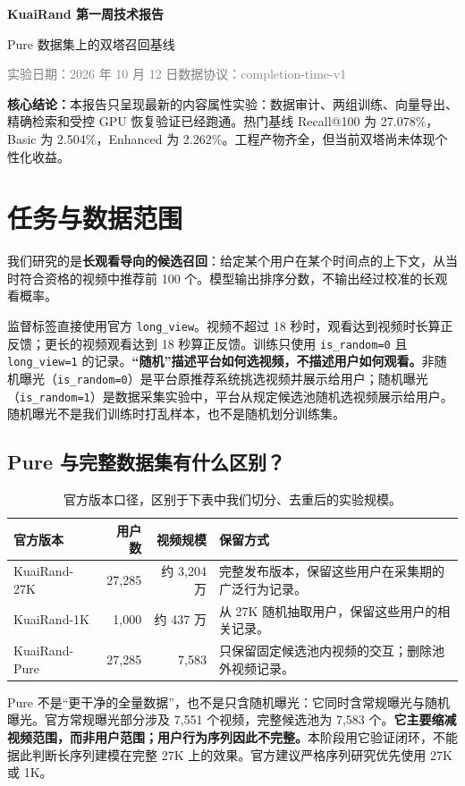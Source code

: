 \documentclass[10pt,a4paper]{article}
\newcommand{\note}[1]{\par\smallskip\noindent\colorbox{pale}{\parbox{\dimexpr\linewidth-2\fboxsep}{\small #1}}\par\smallskip}
\begin{document}
\begin{CJK*}{UTF8}{gbsn}
\renewcommand{\refname}{参考资料}\renewcommand{\tablename}{表}\renewcommand{\figurename}{图}
{\color{accent}\LARGE\bfseries KuaiRand 第一周技术报告}\par
{\large Pure 数据集上的双塔召回基线}\par
\textcolor{gray}{实验日期：2026 年 10 月 12 日\quad 数据协议：completion-time-v1}

\note{\textbf{核心结论：}本报告只呈现最新的内容属性实验：数据审计、两组训练、向量导出、精确检索和受控 GPU 恢复验证已经跑通。热门基线 Recall@100 为 27.078\%，Basic 为 2.504\%，Enhanced 为 2.262\%。工程产物齐全，但当前双塔尚未体现个性化收益。}

\section{任务与数据范围}
我们研究的是\textbf{长观看导向的候选召回}：给定某个用户在某个时间点的上下文，从当时符合资格的视频中推荐前 100 个。模型输出排序分数，不输出经过校准的长观看概率。

监督标签直接使用官方 \texttt{long\_view}。视频不超过 18 秒时，观看达到视频时长算正反馈；更长的视频观看达到 18 秒算正反馈。训练只使用 \texttt{is\_random=0} 且 \texttt{long\_view=1} 的记录。\textbf{“随机”描述平台如何选视频，不描述用户如何观看。}非随机曝光（\texttt{is\_random=0}）是平台原推荐系统挑选视频并展示给用户；随机曝光（\texttt{is\_random=1}）是数据采集实验中，平台从规定候选池随机选视频展示给用户。随机曝光不是我们训练时打乱样本，也不是随机划分训练集。

\subsection{Pure 与完整数据集有什么区别？}
\begin{table}[H]\centering\small
\begin{tabularx}{\linewidth}{lrrY}\toprule
官方版本 & 用户数 & 视频规模 & 保留方式\\\midrule
KuaiRand-27K & 27,285 & 约 3,204 万 & 完整发布版本，保留这些用户在采集期的广泛行为记录。\\
KuaiRand-1K & 1,000 & 约 437 万 & 从 27K 随机抽取用户，保留这些用户的相关记录。\\
KuaiRand-Pure & 27,285 & 7,583 & 只保留固定候选池内视频的交互；删除池外视频记录。\\\bottomrule
\end{tabularx}\caption{官方版本口径，区别于下表中我们切分、去重后的实验规模。}\end{table}
Pure 不是“更干净的全量数据”，也不是只含随机曝光：它同时含常规曝光与随机曝光。官方常规曝光部分涉及 7,551 个视频，完整候选池为 7,583 个。\textbf{它主要缩减视频范围，而非用户范围；用户行为序列因此不完整。}本阶段用它验证闭环，不能据此判断长序列建模在完整 27K 上的效果。官方建议严格序列研究优先使用 27K 或 1K。\cite{dataset}


\end{CJK*}
\end{document}
